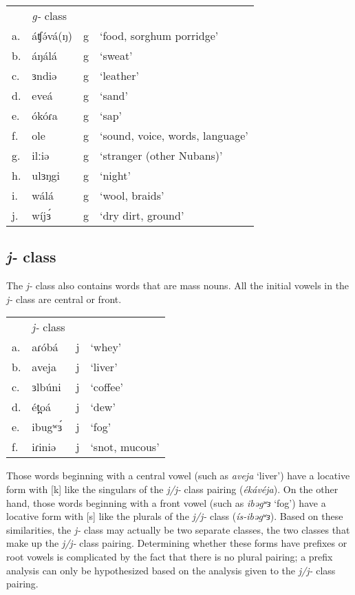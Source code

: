 \ea 	
\begin{tabular}[t]{llll}
&	\textit{g-} class\\
a.	&	áʧə́vá(ŋ)	&	g	&	‘food, sorghum porridge’\\
b.	&	áŋálá	&	g	&	‘sweat’\\
c.	&	ɜndiə	&	g	&	‘leather’\\
d.	&	eveá	&	g 	&	‘sand’\\
e.	&	ókóɾa	&	g	&	‘sap’\\
f.	&	ole		&	g	&	‘sound, voice, words, language’\\
g.	&	ilːiə	&	g	&	‘stranger (other Nubans)’\\
h.	&	ulɜŋgi	&	g	&	‘night’\\
i.	&	wálá	&	g	&	‘wool, braids’\\
j.	&	wíjɜ́	&	g	&	‘dry dirt, ground’\\
\end{tabular}
\z

\subsection{\textit{j-} class}\label{sec:ch6:j}

The \textit{j-} class also contains words that are mass nouns. All the initial vowels in the \textit{j-} class are central or front.

\ea	
\begin{tabular}[t]{llll}
&	\textit{j-} class\\
a.	&	aɾóbá	&	j	&	‘whey’\\
b.	&	aveja	&	j	&	‘liver’\\
c.	&	ɜlbúni	&	j	&	‘coffee’\\
d.	&	ét̪oá	&	j	&	‘dew’\\
e.	&	ibugʷɜ́	&	j	&	‘fog’\\
f.	&	iɾiniə	&	j	&	‘snot, mucous’\\
\end{tabular}
\z

Those words beginning with a central vowel (such as \textit{aveja} ‘liver’) have a locative form with [k] like the singulars of the \textit{j/j-} class pairing (\textit{ékávéja}). On the other hand, those words beginning with a front vowel (such as \textit{ibəgʷɜ} ‘fog’) have a locative form with [s] like the plurals of the \textit{j/j-} class (\textit{ís-ibəgʷɜ}).  Based on these similarities, the \textit{j-} class may actually be two separate classes, the two classes that make up the \textit{j/j-} class pairing. Determining whether these forms have prefixes or root vowels is complicated by the fact that there is no plural pairing; a prefix analysis can only be hypothesized based on the analysis given to the \textit{j/j-} class pairing. 

